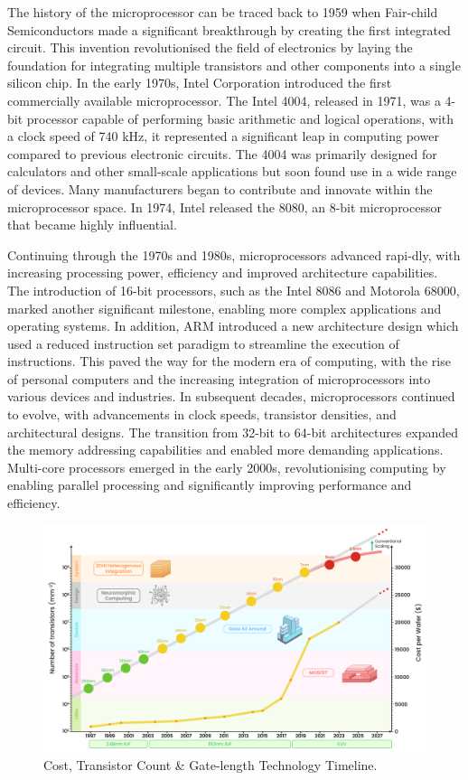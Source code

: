 The history of the microprocessor can be traced back to 1959 when Fair-child Semiconductors made a significant breakthrough by creating the first integrated circuit. This invention revolutionised the field of electronics by laying the foundation for integrating multiple transistors and other components into a single silicon chip. In the early 1970s, Intel Corporation introduced the first commercially available microprocessor. The Intel 4004\cite{Asp97}, released in 1971, was a 4-bit processor capable of performing basic arithmetic and logical operations, with a clock speed of 740 kHz, it represented a significant leap in computing power compared to previous electronic circuits. The 4004 was primarily designed for calculators and other small-scale applications but soon found use in a wide range of devices. Many manufacturers began to contribute and innovate within the microprocessor space. In 1974, Intel released the 8080\cite{Maz07}, an 8-bit microprocessor that became highly influential. 

Continuing through the 1970s and 1980s, microprocessors advanced rapi-dly, with increasing processing power, efficiency and improved architecture capabilities. The introduction of 16-bit processors, such as the Intel 8086 and Motorola 68000, marked another significant milestone, enabling more complex applications and operating systems. In addition, ARM introduced a new architecture design which used a reduced instruction set paradigm to streamline the execution of instructions. This paved the way for the modern era of computing, with the rise of personal computers and the increasing integration of microprocessors into various devices and industries. In subsequent decades, microprocessors continued to evolve, with advancements in clock speeds, transistor densities, and architectural designs. The transition from 32-bit to 64-bit architectures expanded the memory addressing capabilities and enabled more demanding applications. Multi-core processors emerged in the early 2000s\cite{IntelCores}, revolutionising computing by enabling parallel processing and significantly improving performance and efficiency.

\begin{figure}[!tb]
\centering
\includegraphics[width=\linewidth]{Images/transistor_chart.png}
\caption[Semiconductor Timeline]{Cost, Transistor Count \& Gate-length Technology Timeline\cite{Wafer}.}
\label{fig:Transistor}
\end{figure}  

